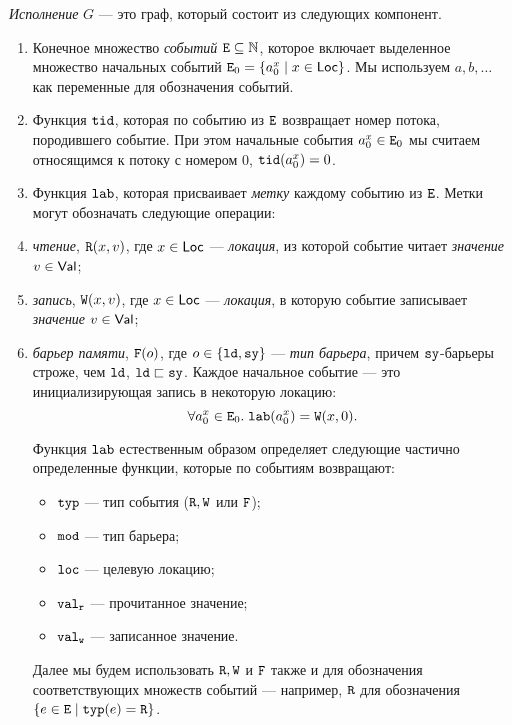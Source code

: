 
\begin{definition}
\label{def:execution}
\emph{Исполнение} $G$ --- это граф, который состоит из следующих компонент.
\begin{enumerate}
\item Конечное множество \emph{событий} $\lE \suq \mathbb{N}$, которое включает
      выделенное множество начальных событий $\lE_0 = \{ a^x_0 \suchthat x \in \Loc \}$.
      Мы используем $a,b,\ldots$ как переменные для обозначения событий.

\item Функция $\lTID$, которая по событию из $\lE$  возвращает номер потока, породившего событие.
      При этом начальные события $a^x_0 \in \lE_0$ мы считаем относящимся к потоку с номером 0,
      $\lTID(a^x_0) = 0$.

\item Функция $\lLAB$, которая присваивает \emph{метку} каждому событию из $\lE$.
      Метки могут обозначать следующие операции:
\squishlist
\item \emph{чтение}, $\evlab{\lR}{o}{x}{v}$, где $x\in\Loc$ ---
  \emph{локация}, из которой событие читает \emph{значение} $v\in\Val$;
\item \emph{запись}, $\evlab{\lW}{o}{x}{v}$, где $x\in\Loc$ ---
  \emph{локация}, в которую событие записывает \emph{значение} $v\in\Val$;
\item \emph{барьер памяти}, $\flab{o}$, где $o\in \{\ld,\full\}$ --- \emph{тип барьера}, причем $\full$-барьеры строже, чем
  $\ld$, $\ld \sqsu \full$.
\squishend
Каждое начальное событие --- это инициализирующая запись в некоторую локацию:
\[\forall a^x_0 \in \lE_0. \; \lLAB(a^x_0) = \evlab{\lW}{\pln}{x}{0}.\]

Функция $\lLAB$ естественным образом определяет следующие частично определенные функции, которые
по событиям возвращают:
\begin{itemize}
  \item $\lTYP$ --- тип события ($\lR,\lW$ или $\lF$);
  \item $\lMOD$ --- тип барьера;
  \item $\lLOC$ --- целевую локацию;
  \item $\lVALR$ --- прочитанное значение;
  \item $\lVALW$ --- записанное значение.
\end{itemize}
Далее мы будем использовать $\lR, \lW$ и $\lF$ также и для обозначения соответствующих множеств
событий --- например, $\lR$ для обозначения $\{e\in \lE \suchthat \lTYP(e)=\lR\}$.


\end{enumerate}
\end{definition}
